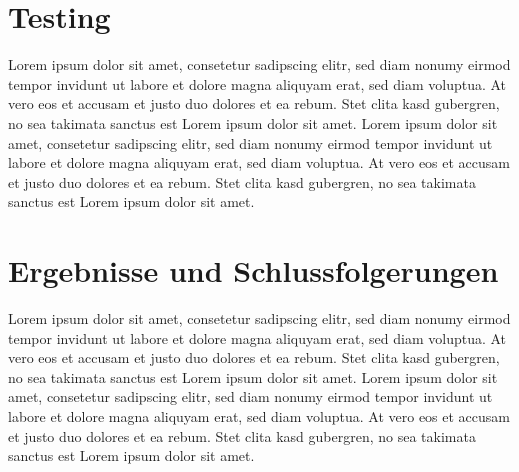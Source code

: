 \chapter{Testing}
Lorem ipsum dolor sit amet, consetetur sadipscing elitr, sed diam nonumy eirmod tempor invidunt ut labore et dolore magna aliquyam erat, sed diam voluptua. At vero eos et accusam et justo duo dolores et ea rebum. Stet clita kasd gubergren, no sea takimata sanctus est Lorem ipsum dolor sit amet. Lorem ipsum dolor sit amet, consetetur sadipscing elitr, sed diam nonumy eirmod tempor invidunt ut labore et dolore magna aliquyam erat, sed diam voluptua. At vero eos et accusam et justo duo dolores et ea rebum. Stet clita kasd gubergren, no sea takimata sanctus est Lorem ipsum dolor sit amet.

\chapter{Ergebnisse und Schlussfolgerungen}
Lorem ipsum dolor sit amet, consetetur sadipscing elitr, sed diam nonumy eirmod tempor invidunt ut labore et dolore magna aliquyam erat, sed diam voluptua. At vero eos et accusam et justo duo dolores et ea rebum. Stet clita kasd gubergren, no sea takimata sanctus est Lorem ipsum dolor sit amet. Lorem ipsum dolor sit amet, consetetur sadipscing elitr, sed diam nonumy eirmod tempor invidunt ut labore et dolore magna aliquyam erat, sed diam voluptua. At vero eos et accusam et justo duo dolores et ea rebum. Stet clita kasd gubergren, no sea takimata sanctus est Lorem ipsum dolor sit amet.